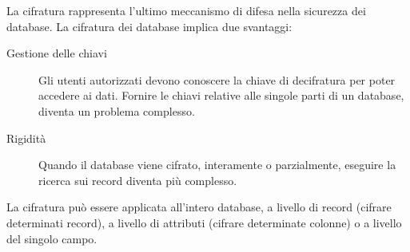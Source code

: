La cifratura rappresenta l'ultimo meccanismo di difesa nella sicurezza dei database. La cifratura dei database implica due svantaggi:

\begin{description}
    \item[Gestione delle chiavi] Gli utenti autorizzati devono conoscere la chiave di decifratura per poter accedere ai dati. Fornire le chiavi relative alle singole parti di un database, diventa un problema complesso.
    \item[Rigidità] Quando il database viene cifrato, interamente o parzialmente, eseguire la ricerca sui record diventa più complesso.
\end{description}

La cifratura può essere applicata all'intero database, a livello di record (cifrare determinati record), a livello di attributi (cifrare determinate colonne) o a livello del singolo campo.